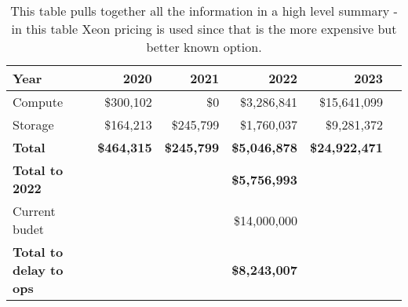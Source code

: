 \tiny \begin{longtable} { |p{}  |r  |r  |r  |r  |r |} 
\caption{This table pulls together all the information in a high level summary - in this table Xeon pricing is used since that is the more expensive but better known option. \label{tab:Summary}}\\ 
\hline 
\textbf{Year}&\textbf{2020}&\textbf{2021}&\textbf{2022}&\textbf{2023} \\ \hline
{Compute}&{\$300,102}&{\$0}&{\$3,286,841}&{\$15,641,099} \\ \hline
{Storage}&{\$164,213}&{\$245,799}&{\$1,760,037}&{\$9,281,372} \\ \hline
\textbf{Total}&\textbf{\$464,315}&\textbf{\$245,799}&\textbf{\$5,046,878}&\textbf{\$24,922,471} \\ \hline
\textbf{Total to 2022}&\textbf{}&\textbf{}&\textbf{\$5,756,993}& \\ \hline
{Current budet}&{}&{}&{\$14,000,000}& \\ \hline
\textbf{Total to delay to ops }&\textbf{}&\textbf{}&\textbf{\$8,243,007}& \\ \hline
\end{longtable} \normalsize

